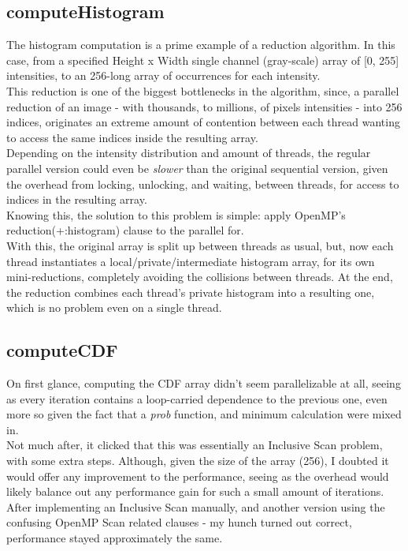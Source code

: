 \documentclass[sigconf]{acmart}
\begin{document}
\subsection{computeHistogram}

The histogram computation is a prime example of a reduction algorithm. In this case, from a specified Height x Width single channel (gray-scale) array of [0, 255] intensities, to an 256-long array of occurrences for each intensity.\\

This reduction is one of the biggest bottlenecks in the algorithm, since, a parallel reduction of an image - with thousands, to millions, of pixels intensities - into 256 indices, originates an extreme amount of contention between each thread wanting to access the same indices inside the resulting array.\\
Depending on the intensity distribution and amount of threads, the regular parallel version could even be \textit{slower} than the original sequential version, given the overhead from locking, unlocking, and waiting, between threads, for access to indices in the resulting array.\\

Knowing this, the solution to this problem is simple: apply OpenMP's reduction(+:histogram) clause to the parallel for.\\
With this, the original array is split up between threads as usual, but, now each thread instantiates a local/private/intermediate histogram array, for its own mini-reductions, completely avoiding the collisions between threads. At the end, the reduction combines each thread's private histogram into a resulting one, which is no problem even on a single thread.

\subsection{computeCDF}

On first glance, computing the CDF array didn't seem parallelizable at all, seeing as every iteration contains a loop-carried dependence to the previous one, even more so given the fact that a \textit{prob} function, and minimum calculation were mixed in.\\

Not much after, it clicked that this was essentially an Inclusive Scan problem, with some extra steps. Although, given the size of the array (256), I doubted it would offer any improvement to the performance, seeing as the overhead would likely balance out any performance gain for such a small amount of iterations. After implementing an Inclusive Scan manually, and another version using the confusing OpenMP Scan related clauses - my hunch turned out correct, performance stayed approximately the same.\\
\end{document}
